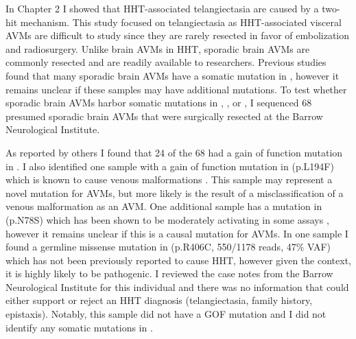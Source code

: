 In Chapter 2 I showed that HHT-associated telangiectasia are caused by a two-hit mechanism. This study focused on telangiectasia as HHT-associated visceral AVMs are difficult to study since they are rarely resected in favor of embolization and radiosurgery. Unlike brain AVMs in HHT, sporadic brain AVMs are commonly resected and are readily available to researchers. Previous studies found that many sporadic brain AVMs have a somatic mutation in  \citep{nikolaev2018}, however it remains unclear if these samples may have additional mutations. To test whether sporadic brain AVMs harbor somatic mutations in , , or , I sequenced 68 presumed sporadic brain AVMs that were surgically resected at the Barrow Neurological Institute. 

As reported by others I found that 24 of the 68 had a gain of function mutation in . I also identified one sample with a gain of function mutation in  (p.L194F) which is known to cause venous malformations \citep{limaye2009}. This sample may represent a novel mutation for AVMs, but more likely is the result of a misclassification of a venous malformation as an AVM. One additional sample has a mutation in  (p.N78S) which has been shown to be moderately activating in some assays \citep{rechsteiner2011}, however it remains unclear if this is a causal mutation for AVMs. In one sample I found a germline missense mutation in  (p.R406C, 550/1178 reads, 47\% VAF) which has not been previously reported to cause HHT, however given the context, it is highly likely to be pathogenic. I reviewed the case notes from the Barrow Neurological Institute for this individual and there was no information that could either support or reject an HHT diagnosis (telangiectasia, family history, epistaxis). Notably, this sample did not have a GOF mutation  and I did not identify any somatic mutations in . 

